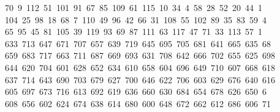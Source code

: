 \begin{tabbing}
\>\ 70\ 9\ 112\ 51\ 101\ 91\ 67\ 85\ 109\ 61\ 115\ 10\ 34\ 4\ 58\ 28\ 52\ 20\ 44\ 1\\[0pt]
\>\ 104\ 25\ 98\ 18\ 68\ 7\ 110\ 49\ 96\ 42\ 66\ 31\ 108\ 55\ 102\ 89\ 35\ 83\ 59\ 4\\[0pt]
\ 65\ 95\ 45\ 81\ 105\ 39\ 119\ 93\ 69\ 87\ 111\ 63\ 117\ 47\ 71\ 33\ 113\ 57\ 1\\[0pt]
\ 633\ 713\ 647\ 671\ 707\ 657\ 639\ 719\ 645\ 695\ 705\ 681\ 641\ 665\ 635\ 68\\[0pt]
\ 659\ 683\ 717\ 663\ 711\ 687\ 669\ 693\ 631\ 708\ 642\ 666\ 702\ 655\ 625\ 698\\[0pt]
\>\ 644\ 620\ 704\ 601\ 628\ 652\ 634\ 610\ 658\ 604\ 696\ 649\ 710\ 607\ 668\ 618\\[0pt]
\>\ 637\ 714\ 643\ 690\ 703\ 679\ 627\ 700\ 646\ 622\ 706\ 603\ 629\ 676\ 640\ 616\ \\[0pt]
\ 605\ 697\ 673\ 716\ 613\ 692\ 619\ 636\ 660\ 630\ 684\ 654\ 678\ 626\ 650\ 6\\[0pt]
\ 608\ 656\ 602\ 624\ 674\ 638\ 614\ 680\ 600\ 648\ 672\ 662\ 612\ 686\ 606\ 71\\[0pt]

\end{tabbing}

